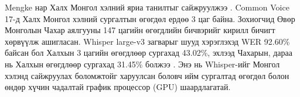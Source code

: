 Mengke нар Халх Монгол хэлний яриа танилтыг сайжруулжээ \cite{mengke2025khalkha}. Common Voice 17-д Халх Монгол хэлний сургалтын өгөгдөл ердөө 3 цаг байна. Зохиогчид Өвөр Монголын Чахар аялгууны 147 цагийн өгөгдлийн бичвэрийг кирилл бичигт хөрвүүлж ашигласан. Whisper large-v3 загварыг шууд хэрэглэхэд \acs{WER} 92.60\% байсан бол Халхын 3 цагийн өгөгдлөөр сургахад 43.02\%, эхлээд Чахарын, дараа нь Халхын өгөгдлөөр сургахад 31.45\% болжээ \cite{mengke2025khalkha}. Энэ нь Whisper-ийг Монгол хэлэнд сайжруулах боломжтойг харуулсан боловч ийм сургалтад өгөгдөл болон өндөр хүчин чадалтай график процессор (\acs{GPU}) шаардлагатай.

